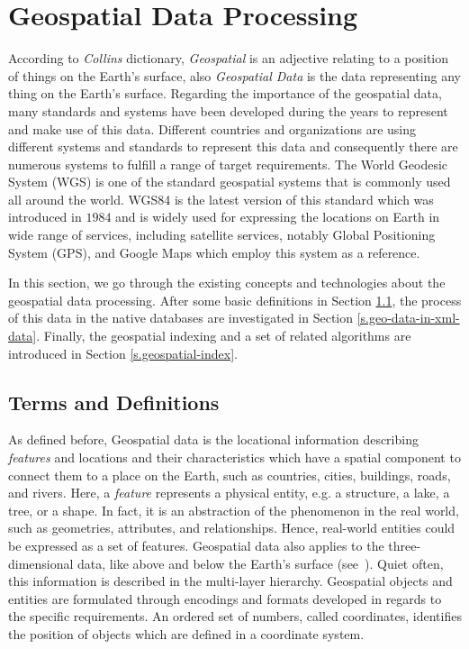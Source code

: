\documentclass[a4paper,12pt]{article}
\begin{document}
\section{Geospatial Data Processing}
\label{s.method}
According to \emph{Collins} dictionary, \emph{Geospatial} is an adjective relating to a position of things on the Earth's surface, also \emph{Geospatial Data} is the data representing any thing on the Earth's surface. Regarding the importance of the geospatial data, many standards and systems have been developed  during the years to represent and make use of this data. Different countries and organizations are using different systems and standards to represent this data and consequently there are numerous systems to fulfill a range of target requirements. The World Geodesic System (WGS) is one of the standard geospatial systems that is commonly used all around the world. WGS84 is the latest version of this standard which
was introduced in $1984$ and is widely used for expressing the locations on Earth in wide range of services, including satellite services, notably Global Positioning System (GPS), and Google Maps which employ this system as a reference.

In this section, we go through the existing concepts and technologies about the geospatial data processing. After some basic definitions in Section \ref{termsanddef}, the process of this data in the native databases are investigated in Section \ref{s.geo-data-in-xml-data}.
Finally, the geospatial indexing and a set of related algorithms are introduced in Section \ref{s.geospatial-index}.

\subsection{Terms and Definitions}
\label{termsanddef}
As defined before, Geospatial data is the locational information describing \textit{features} and locations and their characteristics which have a spatial component to connect them to a place on the Earth, such as countries, cities, buildings, roads, and rivers. Here, a \textit{feature} represents a physical entity, e.g. a structure, a lake, a tree, or a shape. In fact, it is an abstraction of the phenomenon in the real world, such as geometries, attributes, and relationships. Hence, real-world entities could be expressed as a set of features.
Geospatial data also applies to the three-dimensional data, like above and below the Earth's surface (see~\cite{powell}). Quiet often, this information is described in the multi-layer hierarchy. Geospatial objects and entities are formulated through encodings and formats developed in regards to the specific requirements. An ordered set of numbers, called coordinates, identifies the position of objects which are defined in a coordinate system. 
\end{document}
